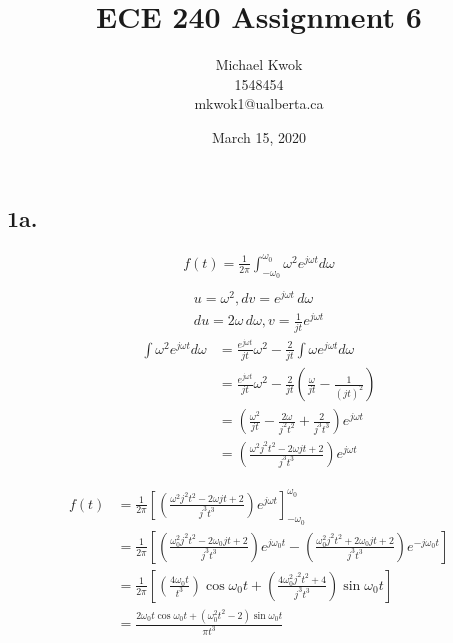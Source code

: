 \documentclass[letterpaper]{article}
\begin{document}
\title{ECE 240 Assignment 6}

\author{Michael Kwok\\1548454\\mkwok1@ualberta.ca}

\date{March 15, 2020}
\maketitle
\newpage
\subsection*{1a.}
\begin{align*}
    f(t) = \frac{1}{2\pi} \int_{-\omega_0}^{\omega_0} \omega^2 e^{j \omega t} d\omega \\
\end{align*}
\begin{align*}
    u = \omega^2, dv = e^{j\omega t}\,d\omega \\
    du = 2 \omega \, d\omega, v = \frac{1}{jt} e^{j\omega t}
\end{align*}
\begin{align*}
 \int \omega^2 e^{j \omega t} d\omega &= \frac{e^{j\omega t}}{jt} \omega^2 - \frac{2}{jt} \int \omega e^{j\omega t} d\omega \\
 &= \frac{e^{j\omega t}}{jt} \omega^2 - \frac{2}{jt} \left( \frac{\omega}{jt} - \frac{1}{\left(jt\right) ^ 2} \right) \\
 &= \left( \frac{\omega ^2}{jt} - \frac{2\omega}{j^2 t^2} + \frac{2}{j^3 t^3}\right) e^{j\omega t} \\
 &= \left( \frac{\omega ^2 j^2 t^2 - 2\omega jt + 2}{j^3 t^3}\right) e^{j\omega t}
\end{align*}

\begin{align*}
f(t) &= \frac{1}{2\pi} \left[ \left( \frac{\omega ^2 j^2 t^2 - 2\omega jt + 2}{j^3 t^3}\right) e^{j\omega t} \right]_{-\omega_0}^{\omega_0}\\
&= \frac{1}{2\pi} \left[ \left( \frac{\omega_0 ^2 j^2 t^2 - 2\omega_0 jt + 2}{j^3 t^3}\right) e^{j\omega_0 t} - \left( \frac{\omega_0 ^2 j^2 t^2 + 2\omega_0 jt + 2}{j^3 t^3}\right) e^{-j\omega_0 t} \right]\\
&= \frac{1}{2\pi} \left[\left( \frac{4\omega_0 t}{ t^3}\right) \cos{\omega_0 t} + \left( \frac{4\omega_0 ^2 j^2 t^2 + 4}{j^3 t^3}\right) \sin{\omega_0 t}  \right] \\
&=\frac{2\omega_0 t\cos{\omega_0 t} + \left( \omega_0 ^2 t^2 - 2\right) \sin{\omega_0 t}}{ \pi t^3}
\end{align*}
\end{document}
